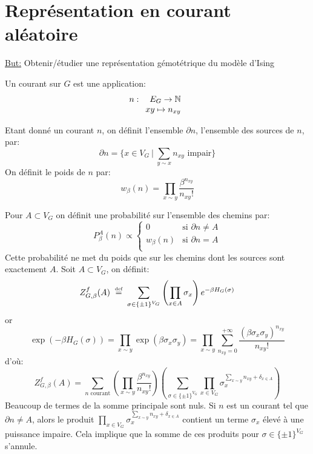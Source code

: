 \documentclass[a4paper,12pt]{report}
\newcommand\eqdef{\mathrel{\stackrel{\makebox[0pt]{\mbox{\normalfont\tiny def}}}{=}}}
\begin{document}
\newpage
\section{Représentation en courant aléatoire}

\underline{But:} Obtenir/étudier une représentation gémotétrique du modèle d'Ising

\begin{defi}[Courant]
Un courant sur $G$ est une application: 
$$n :\begin{array}[t]{rcl} E_G \rightarrow \mathbb{N} \\ xy \mapsto n_{xy} \end{array}$$
\end{defi}

Etant donné un courant $n$, on définit l'ensemble $\partial n$, l'ensemble des sources de $n$, par:
$$
\partial n = \Big\lbrace x \in V_G \ \vert \ \sum_{y \sim x} n_{xy} \text{ impair} \Big\rbrace
$$
On définit le poids de $n$ par:
$$
w_{\beta}(n) = \prod_{x \sim y} \frac{\beta^{n_{xy}}}{n_{xy}!}
$$

Pour $A \subset V_G$ on définit une probabilité sur l'ensemble des chemins par:
$$
P^A_{\beta}(n) \propto 
\begin{cases}
0 & \text{si } \partial n \neq A \\
w_{\beta}(n) & \text{si } \partial n = A \\
\end{cases}
$$
Cette probabilité ne met du poids que sur les chemins dont les sources sont exactement $A$.
Soit $A \subset V_G$, on définit:
$$
Z_{G,\beta}^f(A) \ \eqdef \ \sum_{\sigma \in \{ \pm 1 \}^{V_G} } \left( \prod_{x \in A} \sigma_x \right) e^{- \beta H_G(\sigma)}
$$
or
$$
\exp(-\beta H_G(\sigma)) = \prod_{x \sim y} \exp(\beta \sigma_x \sigma_y) = \prod_{x \sim y} \sum_{n_{xy}=0}^{+ \infty} \frac{(\beta \sigma_x \sigma_y)^{n_{xy}}}{n_{xy}!}
$$
d'où:
$$
Z_{G,\beta}^f(A) = \sum_{n \text{ courant}} \left( \prod_{x \sim y} \frac{\beta^{n_{xy}}}{n_{xy}!} \right) \left( \sum_{\sigma \in \{ \pm 1 \}^{V_G}} \prod_{x \in V_G} \sigma_x^{\sum_{x \sim y} n_{xy} + \delta_{x \in A}} \right)
$$
Beaucoup de termes de la somme principale sont nuls. Si $n$ est un courant tel que $\partial n \neq A$, alors le produit $\prod_{x \in V_G} \sigma_x^{\sum_{x \sim y} n_{xy} + \delta_{x \in A}}$ contient un terme $\sigma_x$ élevé à une puissance impaire. Cela implique que la somme de ces produits pour $\sigma \in \{ \pm 1 \}^{V_G}$ s'annule.
\newline
\end{document}
